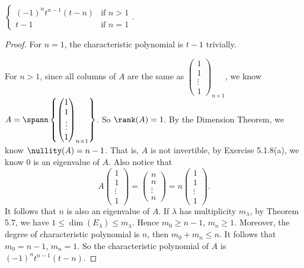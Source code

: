 \begin{Exercise}
	\begin{answer}
		$\begin{cases}
		(-1)^n t^{n-1} (t-n) & \mbox{if }n>1 \\
		t-1 & \mbox{if } n=1
		\end{cases}$.
	\end{answer}
	\begin{proof}
		For $n=1$, the characteristic polynomial is $t-1$ trivially.
		
		For $n>1$, since all columns of $A$ are the same as $\begin{pmatrix}
		1 \\
		1 \\
		\vdots \\
		1
		\end{pmatrix}_{n\times 1}$, we know $A = \spann\left\{\begin{pmatrix}
		1 \\
		1 \\
		\vdots \\
		1
		\end{pmatrix}_{n\times 1}\right\}$. So $\rank(A) = 1$. By the Dimension Theorem, we know $\nullity(A) = n-1$. That is, $A$ is not invertible, by Exercise 5.1.8(a), we know $0$ is an eigenvalue of $A$. Also notice that
		$$
		A\begin{pmatrix}
		1 \\
		1 \\
		\vdots \\
		1
		\end{pmatrix} = \begin{pmatrix}
		n \\
		n \\
		\vdots \\
		n
		\end{pmatrix} = n\begin{pmatrix}
		1 \\
		1 \\
		\vdots \\
		1
		\end{pmatrix}.
		$$
		It follows that $n$ is also an eigenvalue of $A$. If $\lambda$ has multiplicity $m_{\lambda}$, by Theorem 5.7, we have $1\leq \dim(E_{\lambda}) \leq m_{\lambda}$. Hence $m_0 \geq n-1$, $m_n \geq 1$. Moreover, the degree of characteristic polynomial is $n$, then $m_0 + m_n \leq n$. It follows that $m_0 = n-1$, $m_n = 1$. So the characteristic polynomial of $A$ is $(-1)^n t^{n-1} (t-n)$. 
	\end{proof}
\end{Exercise}